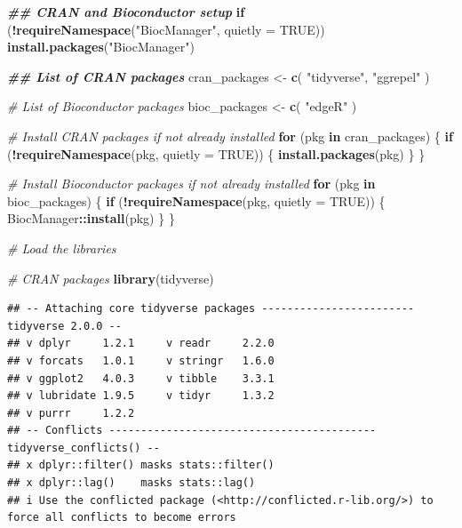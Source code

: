 \documentclass[
]{book}
\newenvironment{Shaded}{\begin{snugshade}}{\end{snugshade}}
\newcommand{\AttributeTok}[1]{\textcolor[rgb]{0.13,0.29,0.53}{#1}}
\newcommand{\CommentTok}[1]{\textcolor[rgb]{0.56,0.35,0.01}{\textit{#1}}}
\newcommand{\ConstantTok}[1]{\textcolor[rgb]{0.56,0.35,0.01}{#1}}
\newcommand{\ControlFlowTok}[1]{\textcolor[rgb]{0.13,0.29,0.53}{\textbf{#1}}}
\newcommand{\DocumentationTok}[1]{\textcolor[rgb]{0.56,0.35,0.01}{\textbf{\textit{#1}}}}
\newcommand{\FunctionTok}[1]{\textcolor[rgb]{0.13,0.29,0.53}{\textbf{#1}}}
\newcommand{\NormalTok}[1]{#1}
\newcommand{\OtherTok}[1]{\textcolor[rgb]{0.56,0.35,0.01}{#1}}
\newcommand{\SpecialCharTok}[1]{\textcolor[rgb]{0.81,0.36,0.00}{\textbf{#1}}}
\newcommand{\StringTok}[1]{\textcolor[rgb]{0.31,0.60,0.02}{#1}}
\begin{document}
\begin{Shaded}
\begin{Highlighting}[]
\DocumentationTok{\#\# CRAN and Bioconductor setup}
\ControlFlowTok{if}\NormalTok{ (}\SpecialCharTok{!}\FunctionTok{requireNamespace}\NormalTok{(}\StringTok{"BiocManager"}\NormalTok{, }\AttributeTok{quietly =} \ConstantTok{TRUE}\NormalTok{))}
  \FunctionTok{install.packages}\NormalTok{(}\StringTok{"BiocManager"}\NormalTok{)}

\DocumentationTok{\#\# List of CRAN packages}
\NormalTok{cran\_packages }\OtherTok{\textless{}{-}} \FunctionTok{c}\NormalTok{(}
  \StringTok{"tidyverse"}\NormalTok{,}
  \StringTok{"ggrepel"}
\NormalTok{)}

\CommentTok{\# List of Bioconductor packages}
\NormalTok{bioc\_packages }\OtherTok{\textless{}{-}} \FunctionTok{c}\NormalTok{(}
  \StringTok{"edgeR"}
\NormalTok{)}

\CommentTok{\# Install CRAN packages if not already installed}
\ControlFlowTok{for}\NormalTok{ (pkg }\ControlFlowTok{in}\NormalTok{ cran\_packages) \{}
  \ControlFlowTok{if}\NormalTok{ (}\SpecialCharTok{!}\FunctionTok{requireNamespace}\NormalTok{(pkg, }\AttributeTok{quietly =} \ConstantTok{TRUE}\NormalTok{)) \{}
    \FunctionTok{install.packages}\NormalTok{(pkg)}
\NormalTok{  \}}
\NormalTok{\}}

\CommentTok{\# Install Bioconductor packages if not already installed}
\ControlFlowTok{for}\NormalTok{ (pkg }\ControlFlowTok{in}\NormalTok{ bioc\_packages) \{}
  \ControlFlowTok{if}\NormalTok{ (}\SpecialCharTok{!}\FunctionTok{requireNamespace}\NormalTok{(pkg, }\AttributeTok{quietly =} \ConstantTok{TRUE}\NormalTok{)) \{}
\NormalTok{    BiocManager}\SpecialCharTok{::}\FunctionTok{install}\NormalTok{(pkg)}
\NormalTok{  \}}
\NormalTok{\}}

\CommentTok{\# Load the libraries}

\CommentTok{\# CRAN packages}
\FunctionTok{library}\NormalTok{(tidyverse)}
\end{Highlighting}
\end{Shaded}

\begin{verbatim}
## -- Attaching core tidyverse packages ------------------------ tidyverse 2.0.0 --
## v dplyr     1.2.1     v readr     2.2.0
## v forcats   1.0.1     v stringr   1.6.0
## v ggplot2   4.0.3     v tibble    3.3.1
## v lubridate 1.9.5     v tidyr     1.3.2
## v purrr     1.2.2     
## -- Conflicts ------------------------------------------ tidyverse_conflicts() --
## x dplyr::filter() masks stats::filter()
## x dplyr::lag()    masks stats::lag()
## i Use the conflicted package (<http://conflicted.r-lib.org/>) to force all conflicts to become errors
\end{verbatim}
\end{document}
